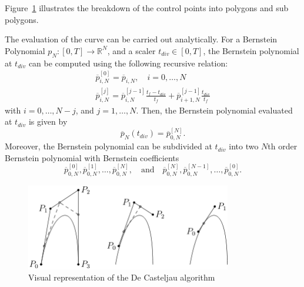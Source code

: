 Figure~\ref{fig:deCasteljau} illustrates the breakdown of the control points into polygons and sub polygons. 
\par The evaluation of the curve can be carried out analytically. For a Bernstein Polynomial $p_N:[0,T]\rightarrow \mathbb{R}^N$, and a scaler $t_{div}\in [0,T]$, the Bernstein polynomial at $t_{div}$ can be computed using the following recursive relation:
\begin{equation}
\begin{gathered}
    \overline{p}^{[0]}_{i,N} = \overline{p}_{i,N},\quad i=0,\dots, N  \\
    \overline{p}^{[j]}_{i,N} = \overline{p}^{[j-1]}_{i,N} \frac{t_f-t_{div}}{t_f} + \overline{p}^{[j-1]}_{i+1,N} \frac{t_{div}}{t_f}
\end{gathered}
\end{equation}
with $i=0,\dots, N-j$, and $j=1,\dots, N$. Then, the Bernstein polynomial evaluated at $t_{div}$ is given by
\begin{equation}
    \overline{p}_N(t_{div}) = \overline{p}_{0,N}^{[N]}.
\end{equation}
Moreover, the Bernstein polynomial can be subdivided at $t_{div}$ into two $N$th order Bernstein polynomial with Bernstein coefficients
\begin{equation}
    \overline{p}^{[0]}_{0,N}, \overline{p}^{[1]}_{0,N}, \dots, \overline{p}^{[N]}_{0,N}, \quad \text{and}\quad \overline{p}^{[N]}_{0,N}, \overline{p}^{[N-1]}_{0,N}, \dots, \overline{p}^{[0]}_{0,N}.
\end{equation}

\begin{figure}[h!]
\centering
\includegraphics[width=0.8\textwidth]{Images/deCasteljau.png}
\caption{Visual representation of the De Casteljau algorithm}
\label{fig:deCasteljau}
\end{figure}


